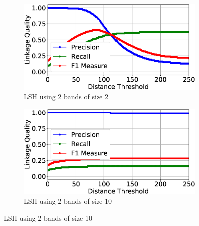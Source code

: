 \documentclass{llncs}
\begin{document}
\begin{figure}
\begin{subfigure}{.5\textwidth}
  \centering
\includegraphics[width=\textwidth]{figures/plotLQ-cora-lsh-2-2}
\vspace{-6mm}
\caption{LSH using 2 bands of size 2}
\end{subfigure}%
\begin{subfigure}{.5\textwidth}
  \centering
\includegraphics[width=\textwidth]{figures/plotLQ-cora-lsh-2-10}
\vspace{-6mm}
\caption{LSH using 2 bands of size 10}
\end{subfigure} \vspace{5mm}


\end{figure}
\end{document}
